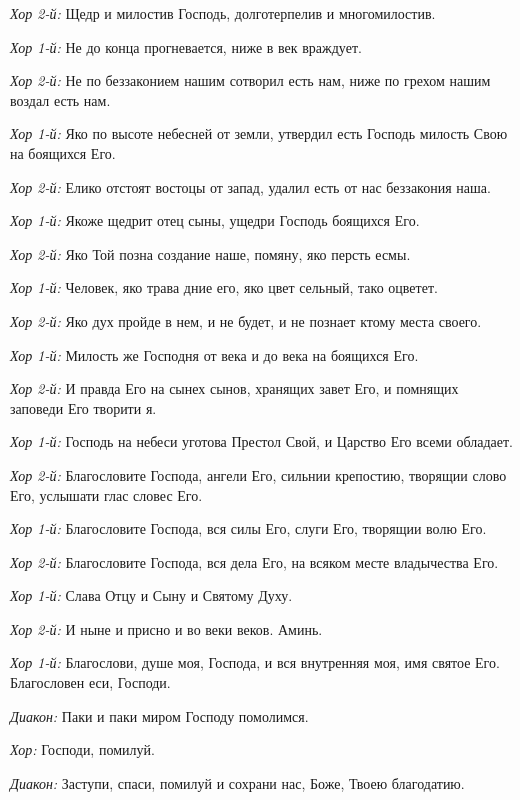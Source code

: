 \begin{mymulticols}
{\itshape Хор 2-й:} Щедр и милостив Господь, долготерпелив и многомилостив.


{\itshape Хор 1-й:} Не до конца прогневается, ниже в век враждует. 


{\itshape Хор 2-й:} Не по беззаконием нашим сотворил есть нам, ниже по грехом нашим воздал есть нам. 


{\itshape Хор 1-й:} Яко по высоте небесней от земли,  утвердил есть Господь милость Свою на боящихся Его. 


{\itshape Хор 2-й:} Елико отстоят востоцы от запад,  удалил есть от нас беззакония наша. 


{\itshape Хор 1-й:} Якоже щедрит отец сыны, ущедри Господь боящихся Его. 


{\itshape Хор 2-й:} Яко Той позна создание наше, помяну, яко персть есмы. 


{\itshape Хор 1-й:} Человек, яко трава дние его, яко цвет сельный, тако оцветет. 


{\itshape Хор 2-й:} Яко дух пройде в нем, и не будет, и не познает ктому места своего. 


{\itshape Хор 1-й:} Милость же Господня от века и до века на боящихся Его. 


{\itshape Хор 2-й:} И правда Его на сынех сынов, хранящих завет Его, и помнящих заповеди Его творити я. 


{\itshape Хор 1-й:} Господь на небеси уготова Престол Свой, и Царство Его всеми обладает. 


{\itshape Хор 2-й:} Благословите Господа, ангели Его,  сильнии крепостию, творящии слово Его, услышати глас словес Его. 


{\itshape Хор 1-й:} Благословите Господа, вся силы Его, слуги Его, творящии волю Его. 


{\itshape Хор 2-й:} Благословите Господа, вся дела Его, на всяком месте владычества Его. 


{\itshape Хор 1-й:} Слава Отцу и Сыну и Святому Духу. 


{\itshape Хор 2-й:} И ныне и присно и во веки веков. Аминь. 


{\itshape Хор 1-й:} Благослови, душе моя, Господа, и вся внутренняя моя, имя святое Его. Благословен еси, Господи.




{\itshape Диакон:} Паки и паки миром Господу помолимся. 


{\itshape Хор:} Господи, помилуй. 


{\itshape Диакон:} Заступи, спаси, помилуй и сохрани нас, Боже, Твоею благодатию. 



\end{mymulticols}
